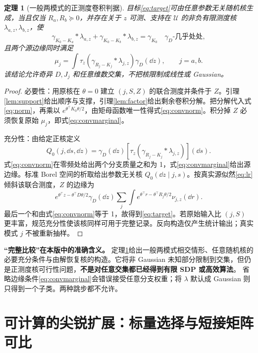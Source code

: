 \documentclass[UTF8,fontset=fandol,11pt,a4paper]{ctexart}
\newtheorem{theorem}{定理}[section]\newtheorem{lemma}[theorem]{引理}
\theoremstyle{definition}\newtheorem{definition}[theorem]{定义}\newtheorem{assumption}[theorem]{条件}
\numberwithin{equation}{section}
\begin{document}
\begin{theorem}[一般两模式的正测度卷积判据]
\label{thm:general}
目标\eqref{eq:target}可由任意参数无关随机核生成，当且仅当 $R_a,R_b\succeq0$，并存在关于 $z$ 可测、支持在 $\mathcal U$ 的非负有限测度核 $\lambda_{a,z},\lambda_{b,z}$，使
\begin{equation}
\boxed{
\gamma_{K_0-K_a}*\lambda_{a,z}
+\gamma_{K_0-K_b}*\lambda_{b,z}
=\gamma_{K_0}
\quad\gamma_D\text{-几乎处处},}
\label{eq:convnorm}
\end{equation}
且两个源边缘同时满足
\begin{equation}
\boxed{
\mu_j=\int\tau_z\!\left(\gamma_{R_j-K_j}*\lambda_{j,z}\right)
\gamma_D(\dd z),\qquad j=a,b.}
\label{eq:convmarginal}
\end{equation}
该结论允许奇异 $D,J_j$ 和任意维数交集，不把核限制成线性或 Gaussian。
\end{theorem}
\begin{proof}
必要性：用原核在 $\theta=0$ 建立 $(j,S,Z)$ 的联合测度并条件于 $Z$。引理\ref{lem:support}给出顺序与支撑，引理\ref{lem:factor}给出剩余卷积分解。把分解代入式\eqref{eq:norm}，再乘以 $e^{\theta^\top K_0\theta/2}$，由矩母函数唯一性得式\eqref{eq:convnorm}。积分掉 $Z$ 必须恢复原始 $\mu_j$，即式\eqref{eq:convmarginal}。

充分性：由给定正核定义
\[
Q_0(j,\dd s,\dd z)=\gamma_D(\dd z)
\left[\tau_z(\gamma_{R_j-K_j}*\lambda_{j,z})\right](\dd s).
\]
式\eqref{eq:convnorm}在零频处给出两个分支质量之和为 1，式\eqref{eq:convmarginal}给出源边缘。标准 Borel 空间的析取给出参数无关核 $Q_0(\dd z\mid j,s)$。按真实源似然\eqref{eq:lr}倾斜该联合测度，$Z$ 的边缘为
\[
e^{\theta^\top z-\theta^\top D\theta/2}\gamma_D(\dd z)
\sum_j\int e^{\theta^\top r-\theta^\top R_j\theta/2}\nu_{j,z}(\dd r).
\]
最后一个和由式\eqref{eq:convnorm}等于 1，故得到\eqref{eq:target}。若原始输入比 $(j,S)$ 更丰富，规范充分性使该核同样可用于完整记录。反向构造仅产生统计输出；真实模式 $j$ 不被重新抽样。
\end{proof}

\begin{keybox}
\textbf{“完整比较”在本版中的准确含义。}
定理\ref{thm:general}给出一般两模式相交情形、任意随机核的必要充分条件与由解恢复核的构造。它将非 Gaussian 未知部分限制到交集，但仍是正测度核可行性问题，\textbf{不是对任意交集都已经得到有限 SDP 或高效算法}。
省略边缘条件\eqref{eq:convmarginal}会错误接受任意分支权重；将 $\lambda$ 默认成 Gaussian 则只得到一个子类。两种跳步都不允许。
\end{keybox}

\section{可计算的尖锐扩展：标量选择与短接矩阵可比}
\label{sec:comparable}
\end{document}
